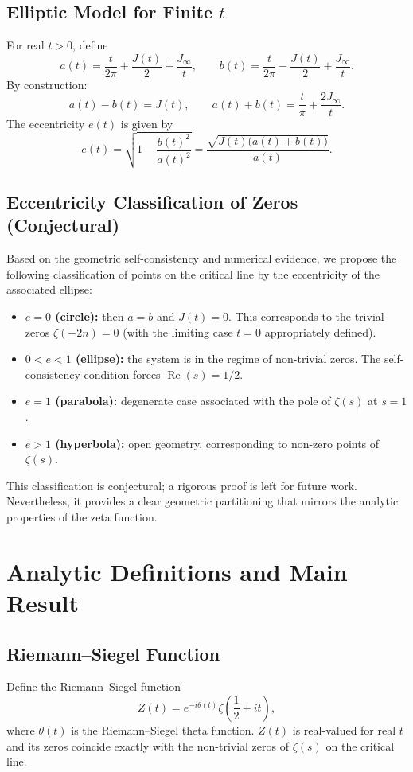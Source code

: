 \documentclass[12pt,a4paper]{article}
\begin{document}
\subsection{Elliptic Model for Finite \(t\)}
For real \(t>0\), define
\[
a(t) = \frac{t}{2\pi} + \frac{J(t)}{2} + \frac{J_{\infty}}{t},\qquad
b(t) = \frac{t}{2\pi} - \frac{J(t)}{2} + \frac{J_{\infty}}{t}.
\]
By construction:
\[
a(t)-b(t)=J(t),\qquad a(t)+b(t)=\frac{t}{\pi}+\frac{2J_{\infty}}{t}.
\]
The eccentricity \(e(t)\) is given by
\[
e(t)=\sqrt{1-\frac{b(t)^2}{a(t)^2}} = \frac{\sqrt{J(t)\bigl(a(t)+b(t)\bigr)}}{a(t)}.
\]

\subsection{Eccentricity Classification of Zeros (Conjectural)}
Based on the geometric self-consistency and numerical evidence, we propose the following classification of points on the critical line by the eccentricity of the associated ellipse:
\begin{itemize}
\item \textbf{\(e=0\) (circle):} then \(a=b\) and \(J(t)=0\). This corresponds to the trivial zeros \(\zeta(-2n)=0\) (with the limiting case \(t=0\) appropriately defined).
\item \textbf{\(0<e<1\) (ellipse):} the system is in the regime of non-trivial zeros. The self-consistency condition forces \(\operatorname{Re}(s)=1/2\).
\item \textbf{\(e=1\) (parabola):} degenerate case associated with the pole of \(\zeta(s)\) at \(s=1\).
\item \textbf{\(e>1\) (hyperbola):} open geometry, corresponding to non-zero points of \(\zeta(s)\).
\end{itemize}
This classification is conjectural; a rigorous proof is left for future work. Nevertheless, it provides a clear geometric partitioning that mirrors the analytic properties of the zeta function.

\section{Analytic Definitions and Main Result}

\subsection{Riemann--Siegel Function}
Define the Riemann--Siegel function
\[
Z(t) = e^{-i\theta(t)}\zeta\!\left(\frac12+it\right),
\]
where \(\theta(t)\) is the Riemann--Siegel theta function. \(Z(t)\) is real-valued for real \(t\) and its zeros coincide exactly with the non-trivial zeros of \(\zeta(s)\) on the critical line.
\end{document}
